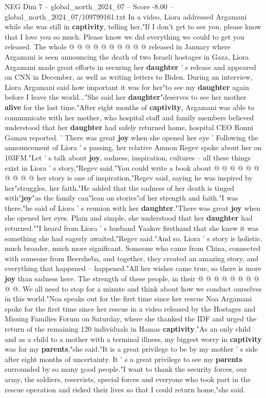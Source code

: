 \begin{textsample}{NEG Dim 7 – global\_north\_2024\_07 – Score -8.00 – global\_north\_2024\_07/109799161.txt}
In a video, Liora addressed Argamani while she was still in \textbf{captivity}, telling her,"If I don't get to see you, please know that I love you so much.
Please know we did everything we could to get you released.
The whole @ @ @ @ @ @ @ @ @ @ released in January where Argamani is seen announcing the death of two Israeli hostages in Gaza, Liora Argamani made great efforts in securing her \textbf{daughter} ' s release and appeared on CNN in December, as well as writing letters to Biden.
During an interview, Liora Argamani said how important it was for her"to see my \textbf{daughter} again before I leave the world..."She said her \textbf{daughter}"deserves to see her mother \textbf{alive} for the last time."After eight months of \textbf{captivity}, Argamani was able to communicate with her mother, who hospital staff and family members believed understood that her \textbf{daughter} had safely returned home, hospital CEO Ronni Gamzu reported. ' There was great \textbf{joy} when she opened her eye ' Following the announcement of Liora ' s passing, her relative Amnon Regev spoke about her on 103FM."Let ' s talk about \textbf{joy}, sadness, inspiration, cultures -- all these things exist in Liora ' s story,"Regev said."You could write a book about @ @ @ @ @ @ @ @ @ @ her story is one of inspiration,"Regev said, saying he was inspired by her"struggles, her faith."He added that the sadness of her death is tinged with"\textbf{joy}"as the family can"lean on stories"of her strength and faith."I was there,"he said of Liora ' s reunion with her \textbf{daughter}."There was great \textbf{joy} when she opened her eyes.
Plain and simple, she understood that her \textbf{daughter} had returned.""I heard from Liora ' s husband Yaakov firsthand that she knew it was something she had eagerly awaited,"Regev said."And so, Liora ' s story is holistic, much broader, much more significant.
Someone who came from China, connected with someone from Beersheba, and together, they created an amazing story, and everything that happened -- happened."All her wishes came true, so there is more \textbf{joy} than sadness here.
The strength of these people, in their @ @ @ @ @ @ @ @ @ @.
We all need to stop for a minute and think about how we conduct ourselves in this world."Noa speaks out for the first time since her rescue Noa Argamani spoke for the first time since her rescue in a video released by the Hostages and Missing Families Forum on Saturday, where she thanked the IDF and urged the return of the remaining 120 individuals in Hamas \textbf{captivity}."As an only child and as a child to a mother with a terminal illness, my biggest worry in \textbf{captivity} was for my \textbf{parents},"she said."It is a great privilege to be by my mother ' s side after eight months of uncertainty.
It ' s a great privilege to see my \textbf{parents} surrounded by so many good people."I want to thank the security forces, our army, the soldiers, reservists, special forces and everyone who took part in the rescue operation and risked their lives so that I could return home,"she said.

\end{textsample}
